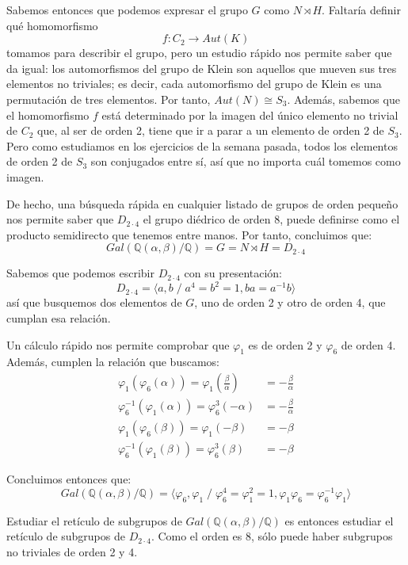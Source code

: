 \documentclass[a4paper, 11pt]{article}
\begin{document}
\begin{solucion}
      Sabemos entonces que podemos expresar el grupo $G$ como $N \rtimes H$. Faltaría definir qué homomorfismo
      \[
      f : C_2 \longrightarrow Aut(K)
      \]
      tomamos para describir el grupo, pero un estudio rápido nos permite saber que da igual: los automorfismos del grupo de Klein son aquellos que mueven sus tres elementos no triviales; es decir, cada automorfismo del grupo de Klein es una permutación de tres elementos. Por tanto, $Aut(N) \cong S_3$. Además, sabemos que el homomorfismo $f$ está determinado por la imagen del único elemento no trivial de $C_2$ que, al ser de orden 2, tiene que ir a parar a un elemento de orden 2 de $S_3$. Pero como estudiamos en los ejercicios de la semana pasada, todos los elementos de orden 2 de $S_3$ son conjugados entre sí, así que no importa cuál tomemos como imagen.

      De hecho, una búsqueda rápida en cualquier listado de grupos de orden pequeño nos permite saber que $D_{2\cdot4}$ el grupo diédrico de orden 8, puede definirse como el producto semidirecto que tenemos entre manos. Por tanto, concluimos que:
      \[
      Gal(\mathbb{Q}(\alpha,\beta)/\mathbb{Q}) = G = N \rtimes H = D_{2 \cdot 4}
      \]

      Sabemos que podemos escribir $D_{2\cdot4}$ con su presentación:
      \[
      D_{2\cdot4} = \langle a,b \;/\; a^4 = b^2 = 1, ba = a^{-1}b\rangle
      \]
      así que busquemos dos elementos de $G$, uno de orden 2 y otro de orden 4, que cumplan esa relación.

      Un cálculo rápido nos permite comprobar que $\varphi_1$ es de orden 2 y $\varphi_6$ de orden 4. Además, cumplen la relación que buscamos:
      \begin{align*}
          \varphi_1(\varphi_6(\alpha)) = \varphi_1(\frac{\beta}{\alpha}) &= -\frac{\beta}{\alpha} \\
          \varphi_6^{-1}(\varphi_1(\alpha)) = \varphi_6^3(-\alpha) &= -\frac{\beta}{\alpha} \\
          \varphi_1(\varphi_6(\beta)) = \varphi_1(-\beta) &= -\beta \\
          \varphi_6^{-1}(\varphi_1(\beta)) = \varphi_6^3(\beta) &= -\beta
      \end{align*}

      Concluimos entonces que:
      \[
      Gal(\mathbb{Q}(\alpha,\beta)/\mathbb{Q}) = \langle \varphi_6,\varphi_1 \;/\; \varphi_6^4 = \varphi_1^2 = 1, \varphi_1\varphi_6 = \varphi_6^{-1}\varphi_1\rangle
      \]

      Estudiar el retículo de subgrupos de $Gal(\mathbb{Q}(\alpha,\beta)/\mathbb{Q})$ es entonces estudiar el retículo de subgrupos de $D_{2\cdot4}$. Como el orden es 8, sólo puede haber subgrupos no triviales de orden 2 y 4.


\end{solucion}
\end{document}
